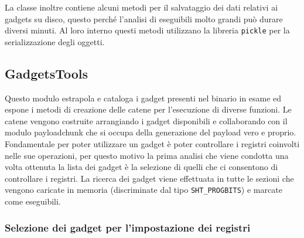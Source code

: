 La classe inoltre contiene alcuni metodi per il salvataggio dei dati
relativi ai gadgets su disco, questo perché l'analisi di eseguibili
molto grandi può durare diversi minuti. Al loro interno questi metodi
utilizzano la libreria \lstinline{pickle} per la serializzazione degli
oggetti.

\subsection{GadgetsTools}

Questo modulo estrapola e cataloga i gadget presenti nel binario in
esame ed espone i metodi di creazione delle catene per l'esecuzione di
diverse funzioni. Le catene vengono costruite arrangiando i gadget
disponibili e collaborando con il modulo payloadchunk che si occupa
della generazione del payload vero e proprio. Fondamentale per poter
utilizzare un gadget è poter controllare i registri coinvolti nelle
sue operazioni, per questo motivo la prima analisi che viene condotta
una volta ottenuta la lista dei gadget è la selezione di quelli che ci
consentono di controllare i registri. La ricerca dei gadget viene
effettuata in tutte le sezioni che vengono caricate in memoria
(discriminate dal tipo \lstinline{SHT_PROGBITS}) e marcate come
eseguibili.

\subsubsection{Selezione dei gadget per l'impostazione dei registri}

